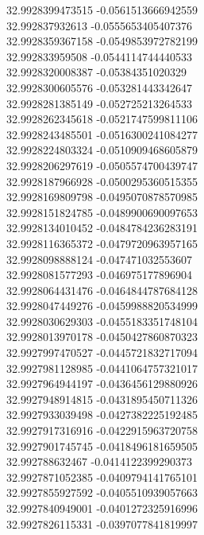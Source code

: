 {32.9928399473515	-0.0561513666942559\\
32.992837932613	-0.0555653405407376\\
32.9928359367158	-0.0549853972782199\\
32.992833959508	-0.0544114744440533\\
32.9928320008387	-0.05384351020329\\
32.9928300605576	-0.053281443342647\\
32.9928281385149	-0.052725213264533\\
32.9928262345618	-0.0521747599811106\\
32.9928243485501	-0.0516300241084277\\
32.9928224803324	-0.0510909468605879\\
32.9928206297619	-0.0505574700439747\\
32.9928187966928	-0.0500295360515355\\
32.9928169809798	-0.0495070878570985\\
32.9928151824785	-0.0489900690097653\\
32.9928134010452	-0.0484784236283191\\
32.9928116365372	-0.0479720963957165\\
32.9928098888124	-0.047471032553607\\
32.9928081577293	-0.046975177896904\\
32.9928064431476	-0.0464844787684128\\
32.9928047449276	-0.0459988820534999\\
32.9928030629303	-0.0455183351748104\\
32.9928013970178	-0.0450427860870323\\
32.9927997470527	-0.0445721832717094\\
32.9927981128985	-0.0441064757321017\\
32.9927964944197	-0.0436456129880926\\
32.9927948914815	-0.0431895450711326\\
32.9927933039498	-0.0427382225192485\\
32.9927917316916	-0.0422915963720758\\
32.9927901745745	-0.0418496181659505\\
32.992788632467	-0.0414122399290373\\
32.9927871052385	-0.0409794141765101\\
32.9927855927592	-0.0405510939057663\\
32.9927840949001	-0.0401272325916996\\
32.9927826115331	-0.0397077841819997\\
}
